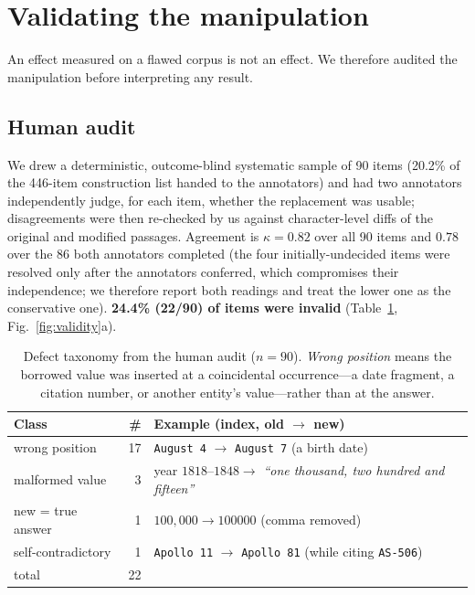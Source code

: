 \documentclass[11pt]{article}
\begin{document}
\section{Validating the manipulation}
\label{sec:validity}

An effect measured on a flawed corpus is not an effect. We therefore audited the
manipulation before interpreting any result.

\subsection{Human audit}
We drew a deterministic, outcome-blind systematic sample of 90 items (20.2\% of the
446-item construction list handed to the annotators) and had two annotators independently judge, for each item,
whether the replacement was usable; disagreements were then re-checked by us against
character-level diffs of the original and modified passages.
Agreement is $\kappa{=}0.82$ over all 90 items and $0.78$ over the 86 both annotators
completed (the four initially-undecided items were resolved only after the annotators
conferred, which compromises their independence; we therefore report both readings and
treat the lower one as the conservative one).
\textbf{24.4\% (22/90) of items were invalid} (Table~\ref{tab:audit}, Fig.~\ref{fig:validity}a).

\begin{table}[t]\centering\small
\caption{Defect taxonomy from the human audit ($n{=}90$). \emph{Wrong position} means the
borrowed value was inserted at a coincidental occurrence---a date fragment, a citation
number, or another entity's value---rather than at the answer.}
\label{tab:audit}
\begin{tabular}{lrl}
\toprule
Class & \# & Example (index, old $\to$ new) \\
\midrule
wrong position & 17 & \texttt{August 4} $\to$ \texttt{August 7} (a birth date) \\
malformed value & 3 & year $1818$--$1848 \to$ \emph{``one thousand, two hundred and fifteen''} \\
new = true answer & 1 & $100{,}000 \to 100000$ (comma removed) \\
self-contradictory & 1 & \texttt{Apollo 11} $\to$ \texttt{Apollo 81} (while citing \texttt{AS-506}) \\
\midrule
total & 22 & \\
\bottomrule
\end{tabular}
\end{table}
\end{document}
